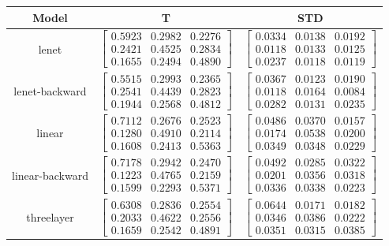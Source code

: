 \documentclass{article} %
\begin{document}
\begin{table}\begin{tabular}{ccc}Model&T&STD\\\hline
lenet & $\begin{bmatrix}0.5923 & 0.2982 & 0.2276\\0.2421 & 0.4525 & 0.2834\\0.1655 & 0.2494 & 0.4890\end{bmatrix}$ & $\begin{bmatrix}0.0334 & 0.0138 & 0.0192\\0.0118 & 0.0133 & 0.0125\\0.0237 & 0.0118 & 0.0119\end{bmatrix}$\\
lenet-backward & $\begin{bmatrix}0.5515 & 0.2993 & 0.2365\\0.2541 & 0.4439 & 0.2823\\0.1944 & 0.2568 & 0.4812\end{bmatrix}$ & $\begin{bmatrix}0.0367 & 0.0123 & 0.0190\\0.0118 & 0.0164 & 0.0084\\0.0282 & 0.0131 & 0.0235\end{bmatrix}$\\
linear & $\begin{bmatrix}0.7112 & 0.2676 & 0.2523\\0.1280 & 0.4910 & 0.2114\\0.1608 & 0.2413 & 0.5363\end{bmatrix}$ & $\begin{bmatrix}0.0486 & 0.0370 & 0.0157\\0.0174 & 0.0538 & 0.0200\\0.0349 & 0.0348 & 0.0229\end{bmatrix}$\\
linear-backward & $\begin{bmatrix}0.7178 & 0.2942 & 0.2470\\0.1223 & 0.4765 & 0.2159\\0.1599 & 0.2293 & 0.5371\end{bmatrix}$ & $\begin{bmatrix}0.0492 & 0.0285 & 0.0322\\0.0201 & 0.0356 & 0.0318\\0.0336 & 0.0338 & 0.0223\end{bmatrix}$\\
threelayer & $\begin{bmatrix}0.6308 & 0.2836 & 0.2554\\0.2033 & 0.4622 & 0.2556\\0.1659 & 0.2542 & 0.4891\end{bmatrix}$ & $\begin{bmatrix}0.0644 & 0.0171 & 0.0182\\0.0346 & 0.0386 & 0.0222\\0.0351 & 0.0315 & 0.0385\end{bmatrix}$\\

\end{tabular}
\end{table}
\end{document}
